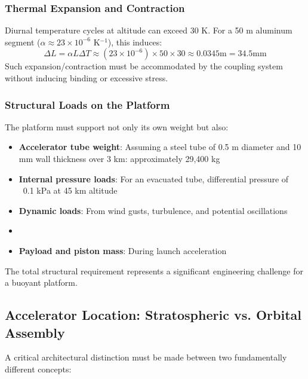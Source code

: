 \begin{itemize}
\subsubsection{Thermal Expansion and Contraction}
Diurnal temperature cycles at altitude can exceed 30 K. For a 50 m aluminum segment ($\alpha \approx 23 \times 10^{-6}$ K$^{-1}$), this induces:
\begin{equation}
\Delta L = \alpha L \Delta T \approx (23 \times 10^{-6}) \times 50 \times 30 \approx 0.0345  \text{m} = 34.5  \text{mm}
\end{equation}
Such expansion/contraction must be accommodated by the coupling system without inducing binding or excessive stress.

\subsubsection{Structural Loads on the Platform}
The platform must support not only its own weight but also:
\begin{itemize}
    \item \textbf{Accelerator tube weight}: Assuming a steel tube of 0.5 m diameter and 10 mm wall thickness over 3 km: approximately 29,400 kg
    \item \textbf{Internal pressure loads}: For an evacuated tube, differential pressure of ~0.1 kPa at 45 km altitude
    \item \textbf{Dynamic loads}: From wind gusts, turbulence, and potential oscillations
    \item \item \textbf{Payload and piston mass}: During launch acceleration
\end{itemize}
The total structural requirement represents a significant engineering challenge for a buoyant platform.

\subsection{Accelerator Location: Stratospheric vs. Orbital Assembly}
A critical architectural distinction must be made between two fundamentally different concepts:


\end{itemize}
